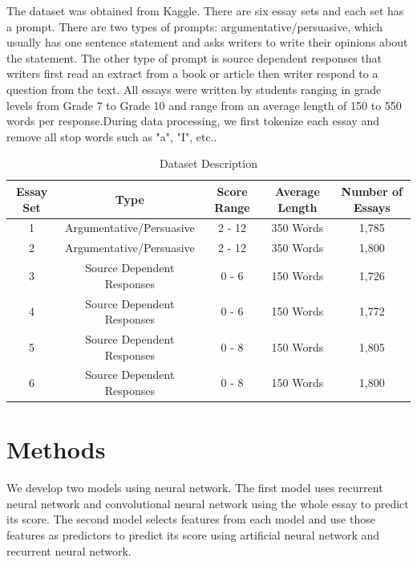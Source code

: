\documentclass[11pt,conference]{IEEEtran}
\begin{document}
The dataset was obtained from Kaggle. There are six essay sets and each set has a prompt. There are two types of prompts: argumentative/persuasive, which usually has one sentence statement and asks writers to write their opinions about the statement. The other type of prompt is source dependent responses that writers first read an extract from a book or article then writer respond to a question from the text. All essays  were written by students ranging in grade levels from Grade 7 to Grade 10 and range from an average length of 150 to 550 words per response.During data processing, we first tokenize each essay and remove all stop words such as "a", "I", etc..
\begin{table}[htbp]
\caption{Dataset Description}
\begin{center}
\begin{tabular}{|c|c|c|c|c|}
\hline

\textbf{Essay Set} & \textbf{Type}& \textbf{Score Range}& \textbf{Average Length}& \textbf{Number of Essays} \\
\hline
1& Argumentative/Persuasive & 2 - 12&  350 Words & 1,785\\
\hline
2& Argumentative/Persuasive & 2 - 12&  350 Words & 1,800\\
\hline
3 & Source Dependent Responses & 0 - 6&  150 Words & 1,726\\
\hline
4 & Source Dependent Responses & 0 - 6&  150 Words & 1,772\\
\hline
5 & Source Dependent Responses & 0 - 8&  150 Words & 1,805\\
\hline
6 & Source Dependent Responses & 0 - 8&  150 Words & 1,800\\
\hline
\end{tabular}
\label{tab1}
\end{center}
\end{table}

\section{Methods}

We develop two models using neural network. The first model uses recurrent neural network and convolutional neural network using the whole essay to predict its score. The second model selects features from each model and use those features as predictors to predict its score using artificial neural network and recurrent neural network. 
\end{document}

